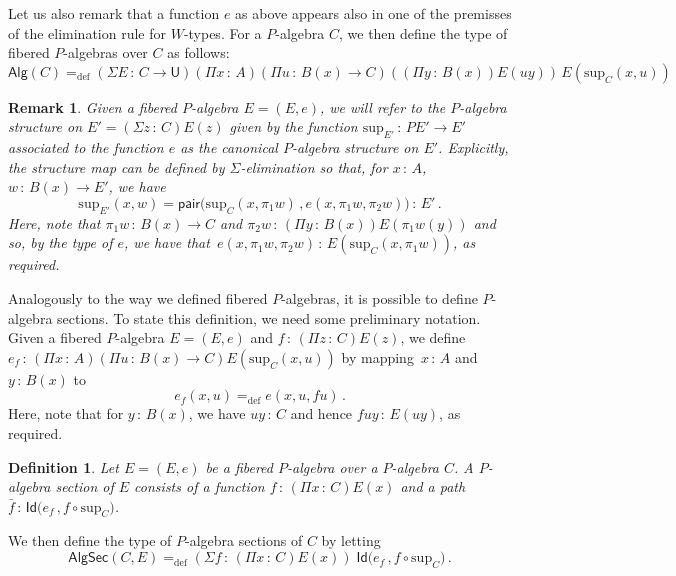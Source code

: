 \documentclass[10pt,a4paper,oneside,reqno]{amsart}
\numberwithin{equation}{section}
\theoremstyle{mythm}
\theoremstyle{mydef}
\newtheorem{definition}[theorem]{Definition}
\theoremstyle{myrmk}
\newtheorem{remark}[theorem]{Remark}
\newcommand{\defeq}{=_{\mathrm{def}}}
\newcommand{\co}{\,{:}\,}
\newcommand{\Id}{\mathsf{Id}}
\newcommand{\pair}{\mathsf{pair}}
\newcommand{\U}{\mathsf{U}}
\newcommand{\Palg}{\mathsf{Alg}}
\renewcommand{\sup}{\mathrm{sup}}
\newcommand{\PalgSec}{\mathsf{AlgSec}}
\begin{document}
Let us also remark that a function $e$ as above appears also in one of the premisses of the
elimination rule for $W$-types. For a $P$-algebra $C$, we then define the type of fibered $P$-algebras 
over $C$ as follows:
\[
\Palg(C) \defeq (\Sigma E \co C \to \U) (\Pi x \co A) (\Pi u \co B(x) \to C) 
 ((\Pi y \co B(x)) E(u y))\,  E(\sup_C(x,u))
 \]
 
 \begin{remark} 
Given a fibered $P$-algebra $E = (E, e)$, we will refer to the $P$-algebra structure
on $E' = (\Sigma z \co C) E(z)$ given by the function $\sup_{E'} \co PE' \to E'$ associated to 
the function $e$ as the canonical $P$-algebra structure on $E'$. Explicitly, the structure
map can be defined by $\Sigma$-elimination so that, for $x \co A$, $w \co B(x) \to E'$, we have
\[
\sup_{E'}(x,w) = 
\pair \big( 
\sup_C(x, \pi_1 w ) \, , 
e( x, \pi_1 w, \pi_2 w) \big) \co E' \, .
\]
Here, note that $\pi_1 w \co B(x) \to C$ and $\pi_2 w \co (\Pi y \co B(x)) E(\pi_1 w (y))$ and so,
by the type of $e$, we have that~$e(x, \pi_1 w, \pi_2 w) \co E( \sup_C(x, \pi_1 w))$, as required.
\end{remark} 

Analogously to the way we defined fibered $P$-algebras, it is possible to define 
$P$-algebra sections. To state this definition, we need some preliminary notation.
Given a fibered $P$-algebra $E = (E, e)$ and  $f \co (\Pi z \co C) E(z)$,
we define $e_f \co (\Pi x \co A)(\Pi u \co B(x) \to C) E(\sup_C(x,u))$ by 
mapping~$x \co A$ and $y \co B(x)$ to 
\begin{equation}
\label{equ:ef}
 e_f(x,u) \defeq e(x, u, f u) \, .
\end{equation}
Here, note that for $y \co B(x)$, we have $u y \co C$ and hence $f u y \co E(uy)$,
as required.


\begin{definition} \label{def:fibalgsection} Let $E = (E, e)$ be a fibered $P$-algebra over a $P$-algebra $C$.  
A \emph{$P$-algebra section} of $E$ consists of a function $f \co (\Pi x \co C) E(x)$ and a path 
$\bar{f} \co  \Id \big( e_f \, , f \circ \sup_C \big)$.
\end{definition} 

\medskip

We then define the type of $P$-algebra sections of $C$ by letting
\[ 
\PalgSec(C,E)  \defeq (\Sigma f  \co (\Pi x \co C) E(x)) \; \Id \big( e_f \, , f \circ \sup_C \big) \, .
\]
\end{document}
